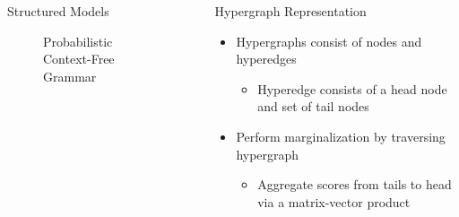 \documentclass{beamer}
\newlength{\sepwid}
\newlength{\onecolwid}
\begin{document}
\begin{frame}
\begin{columns}[t]
\begin{column}{\onecolwid}
\begin{block}{Structured Models}
\begin{figure}
\begin{center}
\end{center}
\caption{Probabilistic Context-Free Grammar}
\end{figure}
\end{block}


\end{column} %

\begin{column}{\sepwid}\end{column} %

\begin{column}{\onecolwid} %


\begin{block}{Hypergraph Representation}

\begin{itemize}
\item Hypergraphs consist of nodes and hyperedges
    \begin{itemize}
    \item Hyperedge consists of a head node and set of tail nodes
    \end{itemize}
\vspace{1em}
\item Perform marginalization by traversing hypergraph
    \begin{itemize}
    \item Aggregate scores from tails to head via a matrix-vector product
    \end{itemize}
\end{itemize}

\begin{figure}
\begin{center}

\end{center}
\end{figure}
\end{block}
\end{column}
\end{columns}
\end{frame}
\end{document}

